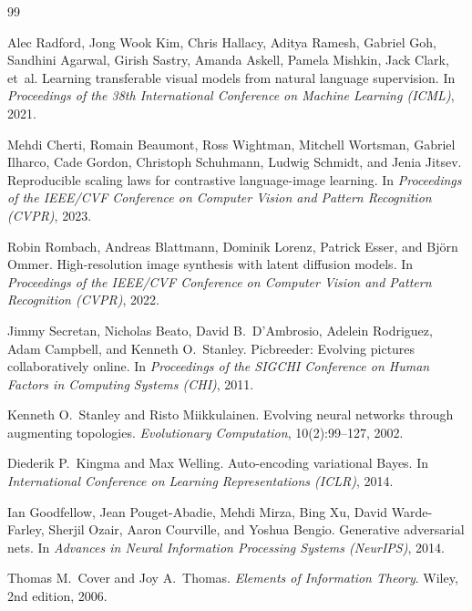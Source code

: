 \documentclass[12pt, a4paper]{article}
\theoremstyle{definition}
\begin{document}
\newpage
\begin{thebibliography}{99}

Alec Radford, Jong Wook Kim, Chris Hallacy, Aditya Ramesh, Gabriel Goh, Sandhini Agarwal, Girish Sastry, Amanda Askell, Pamela Mishkin, Jack Clark, et~al.
\newblock Learning transferable visual models from natural language supervision.
\newblock In \textit{Proceedings of the 38th International Conference on Machine Learning (ICML)}, 2021.

Mehdi Cherti, Romain Beaumont, Ross Wightman, Mitchell Wortsman, Gabriel Ilharco, Cade Gordon, Christoph Schuhmann, Ludwig Schmidt, and Jenia Jitsev.
\newblock Reproducible scaling laws for contrastive language-image learning.
\newblock In \textit{Proceedings of the IEEE/CVF Conference on Computer Vision and Pattern Recognition (CVPR)}, 2023.

Robin Rombach, Andreas Blattmann, Dominik Lorenz, Patrick Esser, and Bj{\"o}rn Ommer.
\newblock High-resolution image synthesis with latent diffusion models.
\newblock In \textit{Proceedings of the IEEE/CVF Conference on Computer Vision and Pattern Recognition (CVPR)}, 2022.

Jimmy Secretan, Nicholas Beato, David B.\ D'Ambrosio, Adelein Rodriguez, Adam Campbell, and Kenneth O.\ Stanley.
\newblock Picbreeder: Evolving pictures collaboratively online.
\newblock In \textit{Proceedings of the SIGCHI Conference on Human Factors in Computing Systems (CHI)}, 2011.

Kenneth O.\ Stanley and Risto Miikkulainen.
\newblock Evolving neural networks through augmenting topologies.
\newblock \textit{Evolutionary Computation}, 10(2):99--127, 2002.

Diederik P.\ Kingma and Max Welling.
\newblock Auto-encoding variational Bayes.
\newblock In \textit{International Conference on Learning Representations (ICLR)}, 2014.

Ian Goodfellow, Jean Pouget-Abadie, Mehdi Mirza, Bing Xu, David Warde-Farley, Sherjil Ozair, Aaron Courville, and Yoshua Bengio.
\newblock Generative adversarial nets.
\newblock In \textit{Advances in Neural Information Processing Systems (NeurIPS)}, 2014.

Thomas M.\ Cover and Joy A.\ Thomas.
\newblock \textit{Elements of Information Theory}.
\newblock Wiley, 2nd edition, 2006.


\end{thebibliography}
\end{document}
